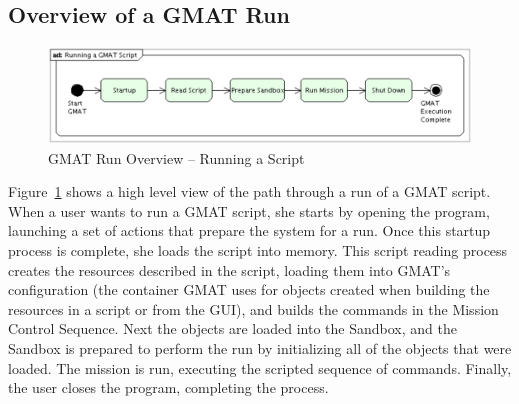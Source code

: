 \subsection{Overview of a GMAT Run}

\begin{figure}[htbp]
\begin{center}
\includegraphics[scale=0.6]{Images/RunningaGMATScript.eps}
\caption{\label{fig:RunScript}GMAT Run Overview -- Running a Script}
\end{center}
\end{figure}

Figure~\ref{fig:RunScript} shows a high level view of the path through a run of a GMAT script.  When a user wants to run a GMAT script, she starts by opening the program, launching a set of actions that prepare the system for a run.  Once this startup process is complete, she loads the script into memory.  This script reading process creates the resources described in the script, loading them into GMAT's configuration (the container GMAT uses for objects created when building the resources in a script or from the GUI), and builds the commands in the Mission Control Sequence.  Next the objects are loaded into the Sandbox, and the Sandbox is prepared to perform the run by initializing all of the objects that were loaded.  The mission is run, executing the scripted sequence of commands. Finally, the user closes the program, completing the process.

